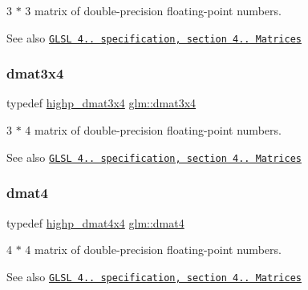 3 $\ast$ 3 matrix of double-\/precision floating-\/point numbers.

\begin{DoxySeeAlso}{See also}
\href{http://www.opengl.org/registry/doc/GLSLangSpec.4.20.8.pdf}{\tt G\+L\+SL 4.. specification, section 4.. Matrices} 
\end{DoxySeeAlso}
\mbox{\label{group__core__types_ga19e745a83cba85f57afa1232276dcc96}} 
\subsubsection{\texorpdfstring{dmat3x4}{dmat3x4}}
{\footnotesize\ttfamily typedef \hyperlink{group__core__precision_ga2f3cf8e3bd4ea0beeefe56b45b14118b}{highp\+\_\+dmat3x4} \hyperlink{group__core__types_ga19e745a83cba85f57afa1232276dcc96}{glm\+::dmat3x4}}

3 $\ast$ 4 matrix of double-\/precision floating-\/point numbers.

\begin{DoxySeeAlso}{See also}
\href{http://www.opengl.org/registry/doc/GLSLangSpec.4.20.8.pdf}{\tt G\+L\+SL 4.. specification, section 4.. Matrices} 
\end{DoxySeeAlso}
\mbox{\label{group__core__types_ga7f7c1300ebfd19d573e9deb1e8758b54}} 
\subsubsection{\texorpdfstring{dmat4}{dmat4}}
{\footnotesize\ttfamily typedef \hyperlink{group__core__precision_ga46855bd8fdcb8dbc7db5d2aaeb91be69}{highp\+\_\+dmat4x4} \hyperlink{group__core__types_ga7f7c1300ebfd19d573e9deb1e8758b54}{glm\+::dmat4}}

4 $\ast$ 4 matrix of double-\/precision floating-\/point numbers.

\begin{DoxySeeAlso}{See also}
\href{http://www.opengl.org/registry/doc/GLSLangSpec.4.20.8.pdf}{\tt G\+L\+SL 4.. specification, section 4.. Matrices} 
\end{DoxySeeAlso}
\mbox{\label{group__core__types_gab3d51ce41e6f0aa267d3e185cee09c44}} 
